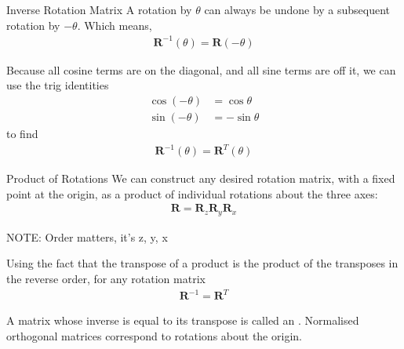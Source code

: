 \documentclass[../COS3712_Notes.tex]{subfiles}
\begin{document}
        \pagebreak

        \begin{theorem}{Inverse Rotation Matrix}
          A rotation by $\theta$ can always be undone by a subsequent rotation by $-\theta$.
          Which means,
          \begin{align*}
            \mathbf{R}^{-1}(\theta) = \mathbf{R}(-\theta)
          \end{align*}

          Because all cosine terms are on the diagonal, and all sine terms are off it,
          we can use the trig identities
          \begin{align*}
            \cos(-\theta) &= \cos\theta\\
            \sin(-\theta) &= -\sin\theta
          \end{align*}
          to find
          \begin{align*}
            \mathbf{R}^{-1}(\theta) = \mathbf{R}^{T}(\theta)
          \end{align*}
        \end{theorem}

        \begin{sidenote}{Product of Rotations}
          We can construct any desired rotation matrix, with a fixed point at the origin,
          as a product of individual rotations about the three axes:
          \begin{align*}
            \mathbf{R} = \mathbf{R}_z\mathbf{R}_y\mathbf{R}_x
          \end{align*}

          NOTE: Order matters, it's z, y, x
        \end{sidenote}

        Using the fact that the transpose of a product is the product of the transposes
        in the reverse order, for any rotation matrix
        \begin{align*}
          \mathbf{R}^{-1} = \mathbf{R}^T
        \end{align*}

        A matrix whose inverse is equal to its transpose is called an .
        Normalised orthogonal matrices correspond to rotations about the origin.
\end{document}
